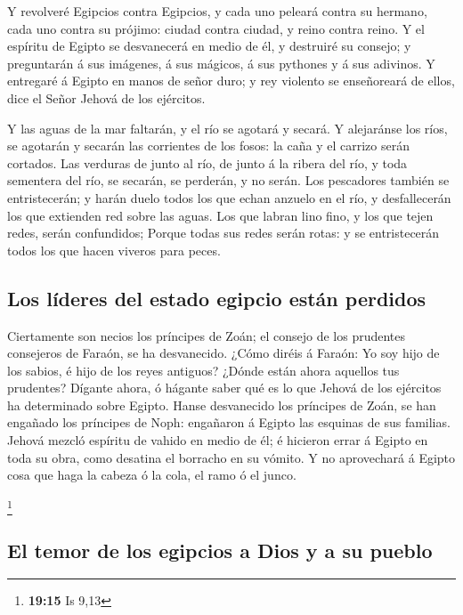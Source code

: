  Y revolveré Egipcios contra Egipcios, y cada uno peleará
contra su hermano, cada uno contra su prójimo: ciudad contra ciudad, y
reino contra reino.  Y el espíritu de Egipto se
desvanecerá en medio de él, y destruiré su consejo; y preguntarán á sus
imágenes, á sus mágicos, á sus pythones y á sus adivinos. 
Y entregaré á Egipto en manos de señor duro; y rey violento se
enseñoreará de ellos, dice el Señor Jehová de los ejércitos.

 Y las aguas de la mar faltarán, y el río se agotará y
secará.  Y alejaránse los ríos, se agotarán y secarán las
corrientes de los fosos: la caña y el carrizo serán cortados.
 Las verduras de junto al río, de junto á la ribera del
río, y toda sementera del río, se secarán, se perderán, y no serán.
 Los pescadores también se entristecerán; y harán duelo
todos los que echan anzuelo en el río, y desfallecerán los que extienden
red sobre las aguas.  Los que labran lino fino, y los que
tejen redes, serán confundidos;  Porque todas sus redes
serán rotas: y se entristecerán todos los que hacen viveros para peces.

\hypertarget{los-luxedderes-del-estado-egipcio-estuxe1n-perdidos}{%
\subsection{Los líderes del estado egipcio están
perdidos}\label{los-luxedderes-del-estado-egipcio-estuxe1n-perdidos}}

 Ciertamente son necios los príncipes de Zoán; el consejo
de los prudentes consejeros de Faraón, se ha desvanecido. ¿Cómo diréis á
Faraón: Yo soy hijo de los sabios, é hijo de los reyes antiguos?
 ¿Dónde están ahora aquellos tus prudentes? Dígante
ahora, ó hágante saber qué es lo que Jehová de los ejércitos ha
determinado sobre Egipto.  Hanse desvanecido los
príncipes de Zoán, se han engañado los príncipes de Noph: engañaron á
Egipto las esquinas de sus familias.  Jehová mezcló
espíritu de vahido en medio de él; é hicieron errar á Egipto en toda su
obra, como desatina el borracho en su vómito.  Y no
aprovechará á Egipto cosa que haga la cabeza ó la cola, el ramo ó el
junco.

\footnote{\textbf{19:15} Is 9,13}

\hypertarget{el-temor-de-los-egipcios-a-dios-y-a-su-pueblo}{%
\subsection{El temor de los egipcios a Dios y a su
pueblo}\label{el-temor-de-los-egipcios-a-dios-y-a-su-pueblo}}

